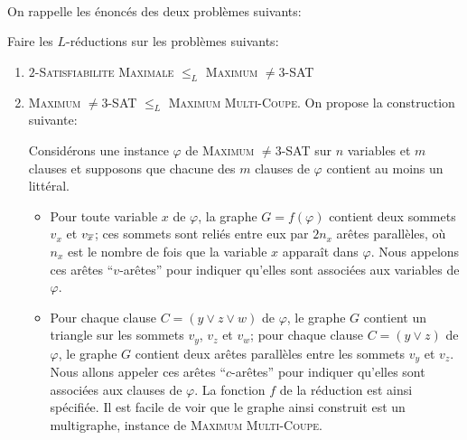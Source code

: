 \begin{td-exo}\,\\ %
	On rappelle les énoncés des deux problèmes suivants:

	
	

	Faire les \(L\)-réductions sur les problèmes suivants:
	\begin{enumerate}
		\item \(2\)-\textsc{Satisfiabilite Maximale} \(\leq_L\) \textsc{Maximum} \(\neq 3\)-\textsc{SAT}

		\item \textsc{Maximum} \(\neq 3\)-\textsc{SAT} \(\leq_L\) \textsc{Maximum Multi-Coupe}.
		On propose la construction suivante:
		\begin{constr}
			Considérons une instance \(\varphi\) de \textsc{Maximum} \(\neq 3\)-\textsc{SAT} sur \(n\) variables et \(m\) clauses et supposons que chacune des \(m\) clauses de \(\varphi\) contient au moins un littéral.
			\begin{itemize}
				\item Pour toute variable \(x\) de \(\varphi\), la graphe \(G = f(\varphi)\) contient deux sommets \(v_x\) et \(v_{\overline{x}}\); ces sommets sont reliés entre eux par \(2n_x\) arêtes parallèles, où \(n_x\) est le nombre de fois que la variable \(x\) apparaît dans \(\varphi\).
				Nous appelons ces arêtes ``\(v\)-arêtes'' pour indiquer qu'elles sont associées aux variables de \(\varphi\).

				\item Pour chaque clause \(C = (y \lor z \lor w)\) de \(\varphi\), le graphe \(G\) contient un triangle sur les sommets \(v_y\), \(v_z\) et \(v_w\); pour chaque clause \(C = (y\lor z)\) de \(\varphi\), le graphe \(G\) contient deux arêtes parallèles entre les sommets \(v_y\) et \(v_z\).
				Nous allons appeler ces arêtes ``\(c\)-arêtes'' pour indiquer qu'elles sont associées aux clauses de \(\varphi\).
				La fonction \(f\) de la réduction est ainsi spécifiée.
				Il est facile de voir que le graphe ainsi construit est un multigraphe, instance de \textsc{Maximum Multi-Coupe}.
			\end{itemize}
		\end{constr}
	\end{enumerate}
\end{td-exo}

